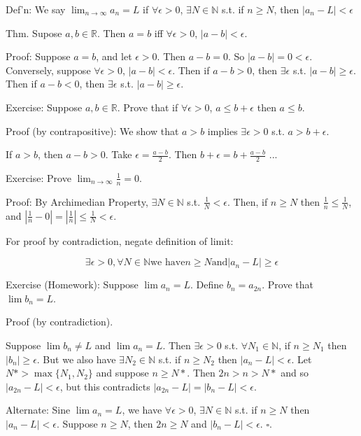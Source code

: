 \documentclass{report}
\begin{document}
Def'n: We say $\lim_{n \rightarrow \infty} a_n = L$ if $\forall \epsilon > 0$, $\exists N \in \mathbb{N}$ s.t. if $n \geq N$, then $\left|a_n - L\right| < \epsilon$

Thm. Supose $a, b \in \mathbb{R}$. Then $a = b$ iff $\forall \epsilon > 0$, $\left|a - b\right| < \epsilon$. 

Proof: Suppose $a = b$, and let $\epsilon > 0$. Then $a - b = 0$. So $\left|a-b\right| = 0 < \epsilon$. 
Conversely, suppose $\forall \epsilon > 0$, $\left|a - b\right| < \epsilon$. 
Then if $a - b > 0$, then $\exists \epsilon$ s.t. $\left|a - b\right| \geq  \epsilon$. 
Then if $a - b < 0$, then $\exists \epsilon$ s.t. $\left|a - b\right| \geq  \epsilon$. 

Exercise: Suppose $a, b \in \mathbb{R}$. Prove that if $\forall \epsilon > 0$, $a \leq b + \epsilon$ then $a \leq b$. 

Proof (by contrapositive): We show that $a > b$ implies $\exists \epsilon > 0$ s.t. $a > b + \epsilon$. 

If $a > b$, then $a - b > 0$. Take $\epsilon = \frac{a - b}{2}$. Then $b + \epsilon = b + \frac{a - b}{2}$ ... 

Exercise: Prove $\lim_{n \rightarrow \infty} \frac{1}{n} = 0$. 

Proof: By Archimedian Property, $\exists N \in \mathbb{N}$ s.t. $\frac{1}{N} < \epsilon$. Then, if $n \geq N$ then $\frac{1}{n} \leq \frac{1}{N}$, and $\left|\frac{1}{n} - 0\right| = \left|\frac{1}{n}\right| \leq \frac{1}{N} < \epsilon$. 

For proof by contradiction, negate definition of limit: 

\[
        \exists \epsilon >  0, \forall N \in \mathbb{N} \text{we have} n \geq N \text{and} \left|a_n - L\right| \geq \epsilon
\]

Exercise (Homework): Suppose $\lim a_n = L$. Define $b_n = a_{2n}$. Prove that $\lim b_n = L$. 

Proof (by contradiction). 

Suppose $\lim b_n \neq L$ and $\lim a_n = L$. Then $\exists \epsilon > 0$ s.t. $\forall N_1 \in \mathbb{N}$, if $n \geq N_1$ then $\left|b_n\right| \geq \epsilon$. 
But we also have $\exists N_2 \in \mathbb{N}$ s.t. if $n \geq N_2$ then $\left|a_n - L\right| < \epsilon$. 
Let $N* > \max\{N_1, N_2\}$ and suppose $n \geq N*$. 
Then $2n > n > N*$ and so $\left|a_{2n} - L\right| < \epsilon$, but this contradicts $\left|a_{2n} - L\right| = \left|b_n - L\right| < \epsilon$. 

Alternate: Sine $\lim a_n = L$, we have $\forall \epsilon > 0$, $\exists N \in \mathbb{N}$ s.t. if $n \geq N$ then $\left|a_n - L\right| < \epsilon$. 
Suppose $n \geq N$, then $2n \geq N$ and $\left|b_n - L\right| < \epsilon$. $\square$. 
\end{document}
